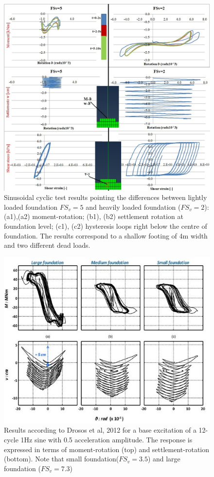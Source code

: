 	\begin{figure}
		\centering
		\includegraphics[width=1\linewidth]{"sin_4m"}
		\caption{Sinusoidal cyclic test results pointing the \mbox{differences} between lightly loaded foundation $FS_v=5$ and heavily loaded foundation ($FS_v=2$): (a1),(a2) moment-rotation; (b1), (b2) settlement rotation at foundation level; (c1), (c2) hysteresis loops right below the centre of foundation. The results correspond to a shallow footing of 4m width and two different dead loads.}
		\label{sin}
\end{figure}

\begin{figure}[!h]
	\centering
	\includegraphics[width=0.6\linewidth]{"drosos2"}
	\caption{Results according to Drosos et al, 2012 for a base excitation of a 12-cycle 1Hz sine with 0.5 acceleration amplitude. The response is expressed in terms of moment-rotation (top) and settlement-rotation (bottom). Note that small foundation($FS_v=3.5$) and large foundation ($FS_v=7.3$)}
	\label{drosos}
\end{figure}

